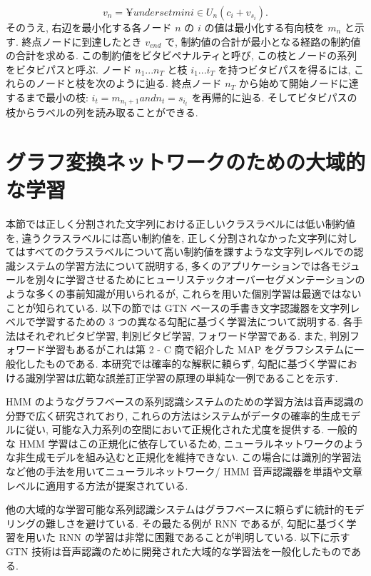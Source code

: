 \documentclass[twocolumn]{jarticle}     %
\begin{document}
\begin{equation}
  v_n = ¥underset{min}{i \in U_n} (c_i + v_{s_i}).
\end{equation}   
そのうえ, 右辺を最小化する各ノード $n$ の $i$ の値は最小化する有向枝を $m_n$ と示す. 終点ノードに到達したとき $v_{end}$ で, 制約値の合計が最小となる経路の制約値の合計を求める. この制約値をビタビペナルティと呼び, この枝とノードの系列をビタビパスと呼ぶ. ノード $n_1 ... n_T$ と枝 $i_1 ... i_T$ を持つビタビパスを得るには, これらのノードと枝を次のように辿る. 
終点ノード $n_T$ から始めて開始ノードに達するまで最小の枝: $i_t = m_{n_t + 1} and n_t = s_{i_t}$ を再帰的に辿る.
そしてビタビパスの枝からラベルの列を読み取ることができる.

\section{グラフ変換ネットワークのための大域的な学習}
本節では正しく分割された文字列における正しいクラスラベルには低い制約値を, 違うクラスラベルには高い制約値を, 正しく分割されなかった文字列に対してはすべてのクラスラベルについて高い制約値を課すような文字列レベルでの認識システムの学習方法について説明する, 
多くのアプリケーションでは各モジュールを別々に学習させるためにヒューリステックオーバーセグメンテーションのような多くの事前知識が用いられるが, これらを用いた個別学習は最適ではないことが知られている. 以下の節では GTN ベースの手書き文字認識器を文字列レベルで学習するための 3 つの異なる勾配に基づく学習法について説明する. 各手法はそれぞれビタビ学習, 判別ビタビ学習, フォワード学習である. また, 判別フォワード学習もあるがこれは第 2 - C 商で紹介した MAP をグラフシステムに一般化したものである. 本研究では確率的な解釈に頼らず, 勾配に基づく学習における識別学習は広範な誤差訂正学習の原理の単純な一例であることを示す. 
\par
HMM のようなグラフベースの系列認識システムのための学習方法は音声認識の分野で広く研究されており, これらの方法はシステムがデータの確率的生成モデルに従い, 可能な入力系列の空間において正規化された尤度を提供する. 一般的な HMM 学習はこの正規化に依存しているため, ニューラルネットワークのような非生成モデルを組み込むと正規化を維持できない.
この場合には識別的学習法など他の手法を用いてニューラルネットワーク/ HMM 音声認識器を単語や文章レベルに適用する方法が提案されている. 
\par
他の大域的な学習可能な系列認識システムはグラフベースに頼らずに統計的モデリングの難しさを避けている. その最たる例が RNN であるが, 勾配に基づく学習を用いた RNN の学習は非常に困難であることが判明している. 以下に示す GTN 技術は音声認識のために開発された大域的な学習法を一般化したものである.
\end{document}
